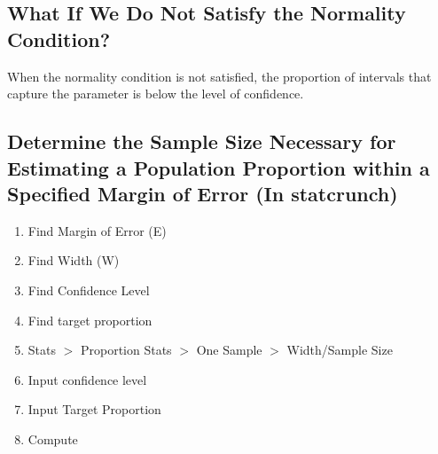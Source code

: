 \documentclass{report}
\begin{document}
   \pagebreak 
   \subsection*{What If We Do Not Satisfy the Normality Condition?}
   \bigbreak \noindent 
   When the normality condition is not satisfied, the proportion of intervals that capture the parameter is below the level of confidence.

   \bigbreak \noindent \bigbreak \noindent 
   \subsection*{Determine the Sample Size Necessary for Estimating a Population Proportion within a Specified Margin of Error (In statcrunch)}
   \bigbreak \noindent 
   \begin{enumerate}
     \item Find Margin of Error (E)
     \item Find Width (W)
      \item Find Confidence Level
      \item Find target proportion
       \item Stats $>$ Proportion Stats $>$ One Sample $> $ Width/Sample Size
      \item Input confidence level
      \item Input Target Proportion
      \item Compute
   \end{enumerate}

   \bigbreak \noindent \bigbreak \noindent 
\end{document}
